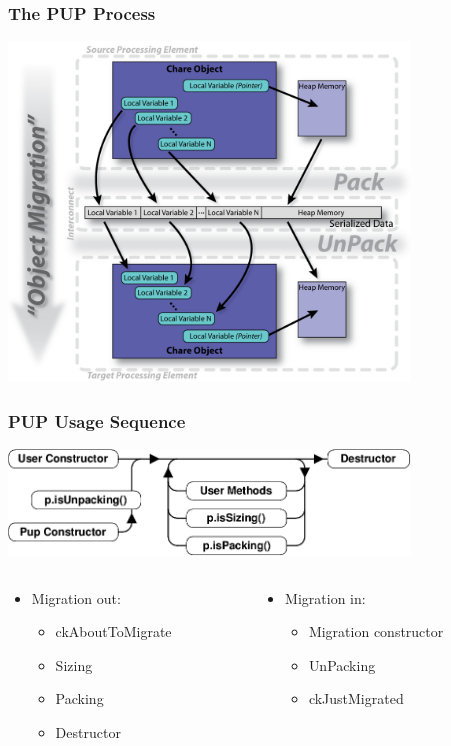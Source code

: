\begin{frame}[fragile]
\frametitle{The PUP Process}
  \begin{center}
    \includegraphics[width=0.8\textwidth]{figures/PUPProcess.png}
  \end{center}
\end{frame}

\begin{frame}[fragile]
\frametitle{PUP Usage Sequence}
  \begin{center}
    \includegraphics[width=0.8\textwidth]{figures/PUPUsage.png}
  \end{center}
\begin{columns}
 \begin{column}{0.5\textwidth}
 \begin{itemize}
 \item Migration out:
   \begin{itemize}
    \item ckAboutToMigrate
    \item Sizing
    \item Packing
    \item Destructor
    \end{itemize}
 \end{itemize}
 \end{column}

 \begin{column}{0.5\textwidth}
 \begin{itemize}
    \item Migration in:
    \begin{itemize}
    \item Migration constructor
    \item UnPacking
    \item ckJustMigrated
    \end{itemize}
  \end{itemize}
\end{column}

\end{columns}
\end{frame}

